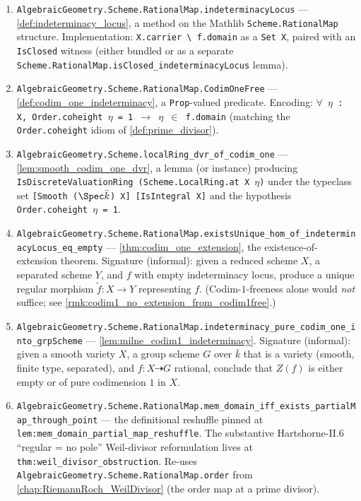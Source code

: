 \begin{enumerate}
  \item \texttt{AlgebraicGeometry.Scheme.RationalMap.indeterminacyLocus} ---
    \cref{def:indeterminacy_locus}, a method on the Mathlib
    \texttt{Scheme.RationalMap} structure. Implementation: \texttt{X.carrier
    \textbackslash{} f.domain} as a \texttt{Set X}, paired with an
    \texttt{IsClosed} witness (either bundled or as a separate
    \texttt{Scheme.RationalMap.isClosed\_indeterminacyLocus} lemma).
  \item \texttt{AlgebraicGeometry.Scheme.RationalMap.CodimOneFree} ---
    \cref{def:codim_one_indeterminacy}, a \texttt{Prop}-valued predicate. Encoding:
    \texttt{\(\forall\) \(\eta\) : X, Order.coheight \(\eta\) = 1 \(\to\) \(\eta\) \(\in\)
    f.domain} (matching the \texttt{Order.coheight} idiom of
    \cref{def:prime_divisor}).
  \item \texttt{AlgebraicGeometry.Scheme.localRing\_dvr\_of\_codim\_one} ---
    \cref{lem:smooth_codim_one_dvr}, a lemma (or instance) producing
    \texttt{IsDiscreteValuationRing (Scheme.LocalRing.at\ X \(\eta\))} under the
    typeclass set \texttt{[Smooth (\(\Spec \bar k\)) X] [IsIntegral X]} and the
    hypothesis \texttt{Order.coheight \(\eta\) = 1}.
  \item \texttt{AlgebraicGeometry.Scheme.RationalMap.existsUnique\_hom\_of\_indeterminacyLocus\_eq\_empty}
    --- \cref{thm:codim_one_extension}, the existence-of-extension theorem. Signature
    (informal): given a reduced scheme \(X\), a separated scheme \(Y\), and
    \(f\) with empty indeterminacy locus, produce a unique regular morphism
    \(\widetilde f \colon X \to Y\) representing \(f\). (Codim-\(1\)-freeness alone
    would \emph{not} suffice; see \cref{rmk:codim1_no_extension_from_codim1free}.)
  \item \texttt{AlgebraicGeometry.Scheme.RationalMap.indeterminacy\_pure\_codim\_one\_into\_grpScheme}
    --- \cref{lem:milne_codim1_indeterminacy}. Signature (informal): given a smooth
    variety \(X\), a group scheme \(G\) over \(\bar k\) that is a variety (smooth, finite
    type, separated), and \(f \colon X \dashrightarrow G\) rational, conclude that
    \(Z(f)\) is either empty or of pure codimension \(1\) in \(X\).
  \item \texttt{AlgebraicGeometry.Scheme.RationalMap.mem\_domain\_iff\_exists\_partialMap\_through\_point}
    --- the definitional reshuffle pinned at
    \texttt{lem:mem_domain_partial_map_reshuffle}. The substantive
    Hartshorne-II.6 ``regular = no pole'' Weil-divisor reformulation lives
    at \texttt{thm:weil_divisor_obstruction}. Re-uses
    \texttt{AlgebraicGeometry.Scheme.RationalMap.order} from
    \cref{chap:RiemannRoch_WeilDivisor} (the order map at a prime divisor).
\end{enumerate}


